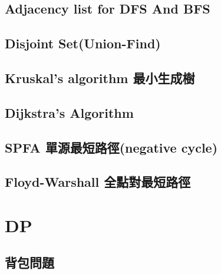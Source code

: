 \subsection{Adjacency list for DFS And BFS}


\subsection{Disjoint Set(Union-Find)}


\subsection{Kruskal’s algorithm 最小生成樹}


\subsection{Dijkstra’s Algorithm}


%

%

\subsection{SPFA 單源最短路徑(negative cycle)}


\subsection{Floyd-Warshall 全點對最短路徑}




\section{DP}

\subsection{背包問題}


